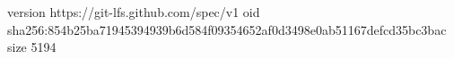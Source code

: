 version https://git-lfs.github.com/spec/v1
oid sha256:854b25ba71945394939b6d584f09354652af0d3498e0ab51167defcd35bc3bac
size 5194
